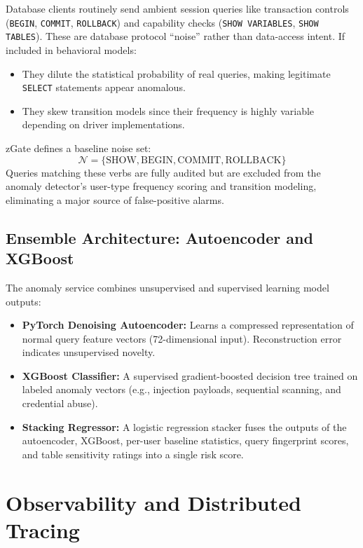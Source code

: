 Database clients routinely send ambient session queries like transaction controls (\texttt{BEGIN}, \texttt{COMMIT}, \texttt{ROLLBACK}) and capability checks (\texttt{SHOW VARIABLES}, \texttt{SHOW TABLES}). These are database protocol ``noise'' rather than data-access intent. If included in behavioral models:
\begin{itemize}
    \item They dilute the statistical probability of real queries, making legitimate \texttt{SELECT} statements appear anomalous.
    \item They skew transition models since their frequency is highly variable depending on driver implementations.
\end{itemize}
zGate defines a baseline noise set:
\[
\mathcal{N} = \{\text{SHOW}, \text{BEGIN}, \text{COMMIT}, \text{ROLLBACK}\}
\]
Queries matching these verbs are fully audited but are excluded from the anomaly detector's user-type frequency scoring and transition modeling, eliminating a major source of false-positive alarms.

\subsection{Ensemble Architecture: Autoencoder and XGBoost}

The anomaly service combines unsupervised and supervised learning model outputs:
\begin{itemize}[leftmargin=*]
    \item \textbf{PyTorch Denoising Autoencoder:} Learns a compressed representation of normal query feature vectors (72-dimensional input). Reconstruction error indicates unsupervised novelty.
    \item \textbf{XGBoost Classifier:} A supervised gradient-boosted decision tree trained on labeled anomaly vectors (e.g., injection payloads, sequential scanning, and credential abuse).
    \item \textbf{Stacking Regressor:} A logistic regression stacker fuses the outputs of the autoencoder, XGBoost, per-user baseline statistics, query fingerprint scores, and table sensitivity ratings into a single risk score.
\end{itemize}

\section{Observability and Distributed Tracing}

